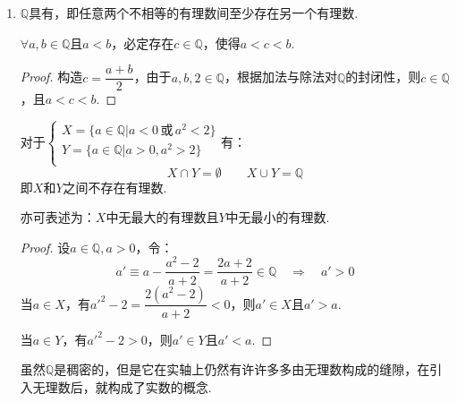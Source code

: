 \begin{enumerate}[property]
\begin{extension}{第一次数学危机}
        据传说，Hippasus被Pythagoras学派的人扔入大海淹死.
    \end{extension}
    \begin{proposition}
        不存在有理数$a$，使得$a^2=2$.
    \end{proposition}
    \begin{proof}
        假设：存在$a=\dfrac{p}{q}$且$p$与$q$的最小公约数为1.
        \[a^2 = \left(\frac{p}{q}\right)^2 = 2 \quad\Rightarrow\quad p^2 = 2q^2\]
        $p^2$是2的倍数，则$p^2$必然是偶数.只有偶数的平方才是偶数，因此$p$也是偶数.则$p$必然等于某个数$p_1$乘以2：
        \[p = 2p_1 \quad\Rightarrow\quad 4p_1^2 = 2q^2 \quad\Rightarrow\quad p^2 = 2p_1^2\]
        这表明$q$也是偶数，与原假设矛盾，故而不存在$a$使得$a^2=2$.
    \end{proof}
    \item $\mathbb{Q}$具有，即任意两个不相等的有理数间至少存在另一个有理数.
    \begin{proposition}
        $\forall a,b \in \mathbb{Q}$且$a < b$，必定存在$c \in \mathbb{Q}$，使得$a < c < b$.
    \end{proposition}
    \begin{proof}
        构造$c = \dfrac{a + b}{2}$，由于$a,b,2 \in \mathbb{Q}$，根据加法与除法对$\mathbb{Q}$的封闭性，则$c \in \mathbb{Q}$，且$a < c < b$.
    \end{proof}
    \begin{proposition}
        对于$\begin{cases}
            X = \{a \in \mathbb{Q} | a<0 \,\text{或}\, a^2<2\} \\
            Y = \{a \in \mathbb{Q} | a>0 ,a^2>2\} \\
        \end{cases}$有：
        \[X \cap Y = \emptyset \qquad X \cup Y = \mathbb{Q}\]
        即$X$和$Y$之间不存在有理数.

        亦可表述为：$X$中无最大的有理数且$Y$中无最小的有理数.
    \end{proposition}
    \begin{proof}
        设$a \in \mathbb{Q},a>0$，令：
        \[a' \equiv a - \frac{a^2-2}{a+2} = \frac{2a+2}{a+2} \in \mathbb{Q} \quad\Rightarrow\quad a' > 0\]
        当$a \in X$，有${a'}^2-2 = \dfrac{2(a^2-2)}{a+2} <0$，则$a' \in X$且$a'>a$.

        当$a \in Y$，有${a'}^2-2 > 0$，则$a' \in Y$且$a'<a$.
    \end{proof}
    虽然$\mathbb{Q}$是稠密的，但是它在实轴上仍然有许许多多由无理数构成的缝隙，在引入无理数后，就构成了实数的概念.
\end{enumerate}


